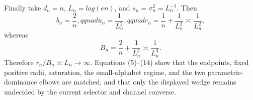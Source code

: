 Finally take \(d_n=n\), \(L_n=log(en)\), and \(s_n=\sigma_n^2=L_n^{-1}\).  Then
\[
 b_n=\frac2n,qquad u_n=\frac1{L_n^2},qquad
 r_n=\frac1n+\frac1{L_n^2}\asymp\frac1{L_n^2},
\tag{13}
\]
whereas
\[
 B_n=\frac2n+\frac1{L_n^3}\asymp\frac1{L_n^3}.
\tag{14}
\]
Therefore \(r_n/B_n\asymp L_n\to\infty\).  Equations (5)--(14) show that the endpoints, fixed positive radii, saturation, the small-alphabet regime, and the two parametric-dominance elbows are matched, and that only the displayed wedge remains undecided by the current selector and channel converse.